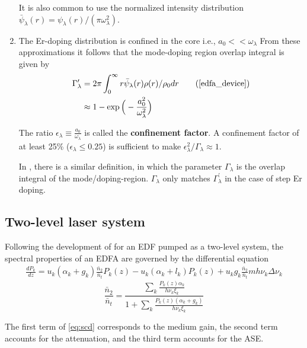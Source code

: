 \documentclass[a4paper]{article}
\begin{document}
\begin{enumerate}
	It is also common to use the normalized intensity distribution  $\bar{\psi}_\lambda(r)  = \psi_\lambda(r)/(\pi\omega_\lambda^2)$.
	
	\item The Er-doping distribution is confined in the core i.e., $a_0 << \omega_\lambda$
	From these approximations it follows that the mode-doping region overlap integral is given by
	\begin{align} 
		\Gamma_\lambda^\prime &= 2\pi\int_0^{\infty} r\bar{\psi}_\lambda(r)\rho(r)/\rho_0dr \tag{\cite[eq. (1.220)]{edfa_device}} \\
		&\approx 1 - \exp\Big(-\frac{a_0^2}{\omega_\lambda^2}\Big)
	\end{align}
	
	The ratio $\epsilon_\lambda\equiv \frac{a_0}{\omega_\lambda}$ is called the \textbf{confinement factor}. A confinement factor of at least 25\% ($\epsilon_\lambda \leq 0.25$) is sufficient to make $\epsilon^2_\lambda/\Gamma_\lambda\approx 1$. 
	
	In \cite{Giles1991}, there is a similar definition, in which the parameter $\Gamma_\lambda$ is the overlap integral of the mode/doping-region. $\Gamma_\lambda$ only matches $\Gamma_\lambda^\prime$ in the case of step Er doping. 
\end{enumerate}

\subsection{Two-level laser system}
Following the development of \cite{Giles1991} for an EDF pumped as a two-level system, the spectral properties of an EDFA are governed by the differential equation
\begin{align} \label{eq:scd}
	\frac{dP_k}{dz} = u_k(\alpha_k + g_k)\frac{\bar{n}_2}{\bar{n}_t}P_k(z) - u_k(\alpha_k + l_k)P_k(z) + u_kg_k\frac{\bar{n}_2}{\bar{n}_t}mh\nu_k\Delta\nu_k
\end{align}
\begin{equation}
	\frac{\bar{n}_2}{\bar{n}_t} = \displaystyle\frac{\displaystyle\sum_k \displaystyle\frac{P_k(z)\alpha_k}{h\nu_k\xi_k}}{1 + \sum_k \displaystyle\frac{P_k(z)(\alpha_k + g_k)}{h\nu_k\xi_k}}
\end{equation}

The first term of \eqref{eq:scd} corresponds to the medium gain, the second term accounts for the attenuation, and the third term accounts for the ASE.
\end{document}
